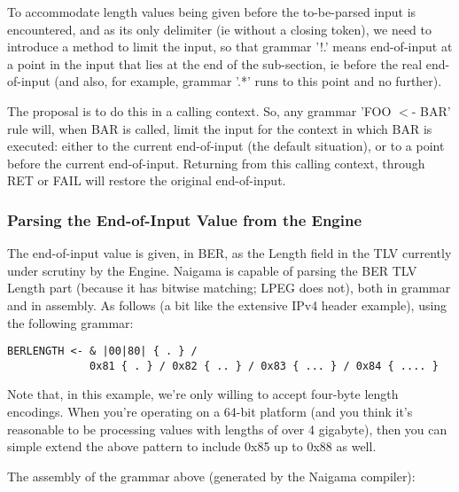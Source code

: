 To accommodate length values being given before the to-be-parsed input is 
encountered, and as its only delimiter (ie without a closing token), we 
need to introduce a method to limit the input, so that grammar '!.' means 
end-of-input at a point in the input that lies at the end of the 
sub-section, ie before the real end-of-input (and also, for example, 
grammar '.*' runs to this point and no further).

The proposal is to do this in a calling context. So, any grammar 'FOO $<$- 
BAR' rule will, when BAR is called, limit the input for the context in 
which BAR is executed: either to the current end-of-input (the default 
situation), or to a point before the current end-of-input. Returning from 
this calling context, through RET or FAIL will restore the original 
end-of-input.

\subsubsection{Parsing the End-of-Input Value from the Engine}
\label{sec:work:tlv:eoi}

The end-of-input value is given, in BER, as the Length field in the TLV 
currently under scrutiny by the Engine. Naigama is capable of parsing the 
BER TLV Length part (because it has bitwise matching; LPEG does not), both 
in grammar and in assembly. As follows (a bit like the extensive IPv4 
header example), using the following grammar:

\begin{changemargin}{-60mm}{0mm}
\begin{myquote}
\begin{verbatim}
BERLENGTH <- & |00|80| { . } /
             0x81 { . } / 0x82 { .. } / 0x83 { ... } / 0x84 { .... }
\end{verbatim}
\end{myquote}
\end{changemargin}

Note that, in this example, we’re only willing to accept four-byte 
length encodings. When you’re operating on a 64-bit platform (and you 
think it’s reasonable to be processing values with lengths of over 4 
gigabyte), then you can simple extend the above pattern to include 0x85 
up to 0x88 as well.

The assembly of the grammar above (generated by the Naigama compiler):

